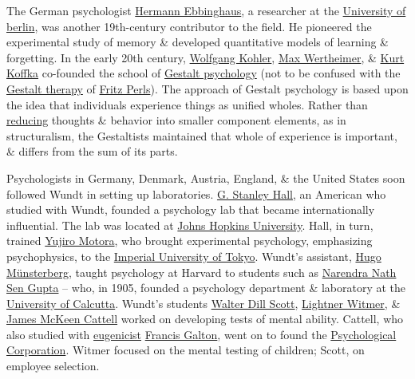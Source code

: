 \documentclass[oneside]{book}
\numberwithin{equation}{section}
\begin{document}
The German psychologist \href{https://en.wikipedia.org/wiki/Hermann_Ebbinghaus}{Hermann Ebbinghaus}, a researcher at the \href{https://en.wikipedia.org/wiki/University_of_Berlin}{University of berlin}, was another 19th-century contributor to the field. He pioneered the experimental study of memory \& developed quantitative models of learning \& forgetting. In the early 20th century, \href{https://en.wikipedia.org/wiki/Wolfgang_Kohler}{Wolfgang Kohler}, \href{https://en.wikipedia.org/wiki/Max_Wertheimer}{Max Wertheimer}, \& \href{https://en.wikipedia.org/wiki/Kurt_Koffka}{Kurt Koffka} co-founded the school of \href{https://en.wikipedia.org/wiki/Gestalt_psychology}{Gestalt psychology} (not to be confused with the \href{https://en.wikipedia.org/wiki/Gestalt_therapy}{Gestalt therapy} of \href{https://en.wikipedia.org/wiki/Fritz_Perls}{Fritz Perls}). The approach of Gestalt psychology is based upon the idea that individuals experience things as unified wholes. Rather than \href{https://en.wikipedia.org/wiki/Reductionism}{reducing} thoughts \& behavior into smaller component elements, as in structuralism, the Gestaltists maintained that whole of experience is important, \& differs from the sum of its parts.

Psychologists in Germany, Denmark, Austria, England, \& the United States soon followed Wundt in setting up laboratories. \href{https://en.wikipedia.org/wiki/G._Stanley_Hall}{G. Stanley Hall}, an American who studied with Wundt, founded a psychology lab that became internationally influential. The lab was located at \href{https://en.wikipedia.org/wiki/Johns_Hopkins_University}{Johns Hopkins University}. Hall, in turn, trained \href{https://en.wikipedia.org/wiki/Y%C5%ABjir%C5%8D_Motora}{Yujiro Motora}, who brought experimental psychology, emphasizing psychophysics, to the \href{https://en.wikipedia.org/wiki/Imperial_University_of_Tokyo}{Imperial University of Tokyo}. Wundt's assistant, \href{https://en.wikipedia.org/wiki/Hugo_M%C3%BCnsterberg}{Hugo M\"unsterberg}, taught psychology at Harvard to students such as \href{https://en.wikipedia.org/wiki/Narendra_Nath_Sen_Gupta}{Narendra Nath Sen Gupta} -- who, in 1905, founded a psychology department \& laboratory at the \href{https://en.wikipedia.org/wiki/University_of_Calcutta}{University of Calcutta}. Wundt's students \href{https://en.wikipedia.org/wiki/Walter_Dill_Scott}{Walter Dill Scott}, \href{https://en.wikipedia.org/wiki/Lightner_Witmer}{Lightner Witmer}, \& \href{https://en.wikipedia.org/wiki/James_McKeen_Cattell}{James McKeen Cattell} worked on developing tests of mental ability. Cattell, who also studied with \href{https://en.wikipedia.org/wiki/Eugenics}{eugenicist} \href{https://en.wikipedia.org/wiki/Francis_Galton}{Francis Galton}, went on to found the \href{https://en.wikipedia.org/wiki/Psychological_Corporation}{Psychological Corporation}. Witmer focused on the mental testing of children; Scott, on employee selection.
\end{document}
